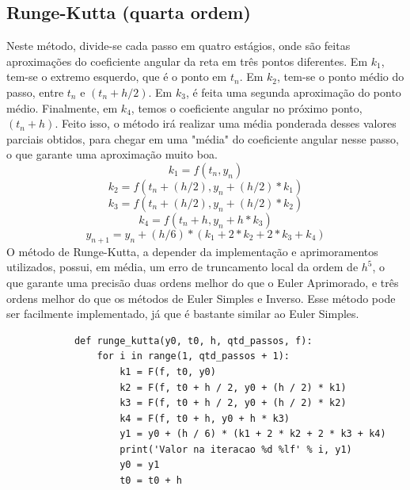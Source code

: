\documentclass{article}
\begin{document}
\begin{otherlanguage}{brazil}
    \subsection{Runge-Kutta (quarta ordem)}
            Neste método, divide-se cada passo em quatro estágios, onde são feitas aproximações do coeficiente angular da reta em três pontos diferentes. Em $k_1$, tem-se o extremo esquerdo, que é o ponto em $t_n$. Em $k_2$, tem-se o ponto médio do passo, entre $t_n$ e $(t_n + h / 2)$. Em $k_3$, é feita uma segunda aproximação do ponto médio. Finalmente, em $k_4$, temos o coeficiente angular no próximo ponto, $(t_n + h)$. Feito isso, o método irá realizar uma média ponderada desses valores parciais obtidos, para chegar em uma "média" do coeficiente angular nesse passo, o que garante uma aproximação muito boa.\newline
            \begin{equation}
                k_1 = f(t_n, y_n)
            \end{equation}
            \begin{equation}
                k_2 = f(t_n + (h / 2), y_n + (h / 2) * k_1)
            \end{equation}
            \begin{equation}
                k_3 = f(t_n + (h / 2), y_n + (h / 2) * k_2)
            \end{equation}
            \begin{equation}
                k_4 = f(t_n + h, y_n + h * k_3)
            \end{equation}
            \begin{equation}
                y_{n+1} = y_n + (h / 6) * (k_1 + 2 * k_2 + 2 * k_3 + k_4)
            \end{equation}
            O método de Runge-Kutta, a depender da implementação e aprimoramentos utilizados, possui, em média, um erro de truncamento local da ordem de $h^5$, o que garante uma precisão duas ordens melhor do que o Euler Aprimorado, e três ordens melhor do que os métodos de Euler Simples e Inverso. Esse método pode ser facilmente implementado, já que é bastante similar ao Euler Simples.\newline
            \begin{lstlisting}
            def runge_kutta(y0, t0, h, qtd_passos, f):
                for i in range(1, qtd_passos + 1):
                    k1 = F(f, t0, y0)
                    k2 = F(f, t0 + h / 2, y0 + (h / 2) * k1)
                    k3 = F(f, t0 + h / 2, y0 + (h / 2) * k2)
                    k4 = F(f, t0 + h, y0 + h * k3)
                    y1 = y0 + (h / 6) * (k1 + 2 * k2 + 2 * k3 + k4)
                    print('Valor na iteracao %d %lf' % i, y1)
                    y0 = y1
                    t0 = t0 + h
            \end{lstlisting}

\end{otherlanguage}
\end{document}
